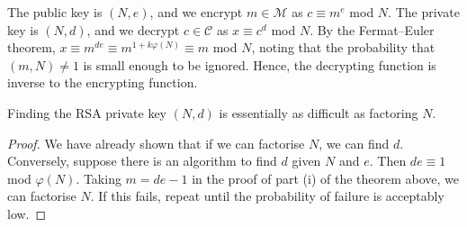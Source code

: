 The public key is \( (N, e) \), and we encrypt \( m \in \mathcal M \) as \( c \equiv m^e \) mod \( N \).
The private key is \( (N, d) \), and we decrypt \( c \in \mathcal C \) as \( x \equiv c^d \) mod \( N \).
By the Fermat--Euler theorem, \( x \equiv m^{de} \equiv m^{1+k\varphi(N)} \equiv m \) mod \( N \), noting that the probability that \( (m, N) \neq 1 \) is small enough to be ignored.
Hence, the decrypting function is inverse to the encrypting function.
% 
\begin{corollary}
    Finding the RSA private key \( (N, d) \) is essentially as difficult as factoring \( N \).
\end{corollary}
\begin{proof}
    We have already shown that if we can factorise \( N \), we can find \( d \).
    Conversely, suppose there is an algorithm to find \( d \) given \( N \) and \( e \).
    Then \( de \equiv 1 \) mod \( \varphi(N) \).
    Taking \( m = de-1 \) in the proof of part (i) of the theorem above, we can factorise \( N \).
    If this fails, repeat until the probability of failure is acceptably low.
\end{proof}
